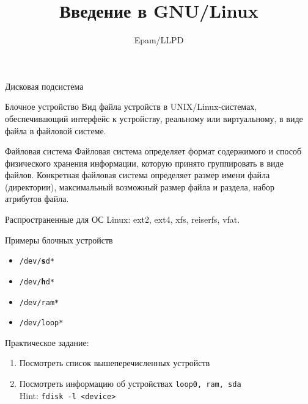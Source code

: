 \documentclass[ignorenonframetext, professionalfonts, hyperref={pdftex, unicode}]{beamer}
\title{Введение в GNU/Linux}
\author{Epam/LLPD}
\begin{document}
\frame{
	\tableofcontents
}


\begin{frame}{Дисковая подсистема}

	\begin{block}{Блочное устройство}
		Вид файла устройств в UNIX/Linux-системах,  обеспечивающий интерфейс к устройству,
		реальному или виртуальному, в виде файла в файловой системе.
	\end{block}

	\begin{block}{Файловая система}
		Файловая система определяет формат содержимого и способ физического хранения информации,  
		которую принято группировать в виде файлов. 
		Конкретная файловая система определяет размер имени файла (директории),  
		максимальный возможный размер файла и раздела,  набор атрибутов файла.

		Распространенные для ОС Linux: ext2, ext4, xfs, reiserfs, vfat.
	\end{block}
\end{frame}

\begin{frame}{Примеры блочных устройств}

	\begin{itemize}
		\item {\tt /dev/{\bf s}d*}
		\item {\tt /dev/{\bf h}d*}
		\item {\tt /dev/ram*}
		\item {\tt /dev/loop*}
	\end{itemize}

	\begin{block}{Практическое задание:}
		\begin{enumerate}
			\item Посмотреть список вышеперечисленных устройств
			\item Посмотреть информацию об устройствах {\tt loop0, ram, sda}\\
				Hint: {\tt fdisk -l <device>}
		\end{enumerate}
	\end{block}
\end{frame}
\end{document}
